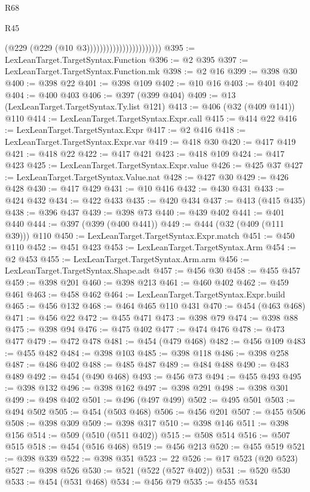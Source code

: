 \begin{lexlean}{R68}
\begin{lexlean}{R45}
\begin{coremodule}
{{{{{{{{{{{{{{{{{{{{{{{{{{{{{{{{{{{{{{{{{{{{{{{{{{{{{{{{{{{{{{{{{{{{{{{{{{{{{{{{{{{{{{{{{{{                                            (@229 (@229 (@10 @3)))))))))))))))))))))))
@395 := LexLeanTarget.TargetSyntax.Function
@396 := @2 @395
@397 := LexLeanTarget.TargetSyntax.Function.mk
@398 := @2 @16
@399 := @398 @30
@400 := @398 @22
@401 := @398 @109
@402 := @10 @16
@403 := @401 @402
@404 := @400 @403
@406 := @397 (@399 @404)
@409 := @13 (LexLeanTarget.TargetSyntax.Ty.list @121)
@413 := @406 (@32 (@409 @141)) @110
@414 := LexLeanTarget.TargetSyntax.Expr.call
@415 := @414 @22
@416 := LexLeanTarget.TargetSyntax.Expr
@417 := @2 @416
@418 := LexLeanTarget.TargetSyntax.Expr.var
@419 := @418 @30
@420 := @417 @419
@421 := @418 @22
@422 := @417 @421
@423 := @418 @109
@424 := @417 @423
@425 := LexLeanTarget.TargetSyntax.Expr.value
@426 := @425 @37
@427 := LexLeanTarget.TargetSyntax.Value.nat
@428 := @427 @30
@429 := @426 @428
@430 := @417 @429
@431 := @10 @416
@432 := @430 @431
@433 := @424 @432
@434 := @422 @433
@435 := @420 @434
@437 := @413 (@415 @435)
@438 := @396 @437
@439 := @398 @73
@440 := @439 @402
@441 := @401 @440
@444 := @397 (@399 (@400 @441))
@449 := @444 (@32 (@409 (@111 @39))) @110
@450 := LexLeanTarget.TargetSyntax.Expr.match
@451 := @450 @110
@452 := @451 @423
@453 := LexLeanTarget.TargetSyntax.Arm
@454 := @2 @453
@455 := LexLeanTarget.TargetSyntax.Arm.arm
@456 := LexLeanTarget.TargetSyntax.Shape.adt
@457 := @456 @30
@458 := @455 @457
@459 := @398 @201
@460 := @398 @213
@461 := @460 @402
@462 := @459 @461
@463 := @458 @462
@464 := LexLeanTarget.TargetSyntax.Expr.build
@465 := @456 @132
@468 := @464 @465 @110 @431
@470 := @454 (@463 @468)
@471 := @456 @22
@472 := @455 @471
@473 := @398 @79
@474 := @398 @88
@475 := @398 @94
@476 := @475 @402
@477 := @474 @476
@478 := @473 @477
@479 := @472 @478
@481 := @454 (@479 @468)
@482 := @456 @109
@483 := @455 @482
@484 := @398 @103
@485 := @398 @118
@486 := @398 @258
@487 := @486 @402
@488 := @485 @487
@489 := @484 @488
@490 := @483 @489
@492 := @454 (@490 @468)
@493 := @456 @73
@494 := @455 @493
@495 := @398 @132
@496 := @398 @162
@497 := @398 @291
@498 := @398 @301
@499 := @498 @402
@501 := @496 (@497 @499)
@502 := @495 @501
@503 := @494 @502
@505 := @454 (@503 @468)
@506 := @456 @201
@507 := @455 @506
@508 := @398 @309
@509 := @398 @317
@510 := @398 @146
@511 := @398 @156
@514 := @509 (@510 (@511 @402))
@515 := @508 @514
@516 := @507 @515
@518 := @454 (@516 @468)
@519 := @456 @213
@520 := @455 @519
@521 := @398 @339
@522 := @398 @351
@523 := 22
@526 := @17 @523 (@20 @523)
@527 := @398 @526
@530 := @521 (@522 (@527 @402))
@531 := @520 @530
@533 := @454 (@531 @468)
@534 := @456 @79
@535 := @455 @534
}}}}}}}}}}}}}}}}}}}}}}}}}}}}}}}}}}}}}}}}}}}}}}}}}}}}}}}}}}}}}}}}}}}}}}}}}}}}}}}}}}}}}}}}}}}
\end{coremodule}
\end{lexlean}
\end{lexlean}
